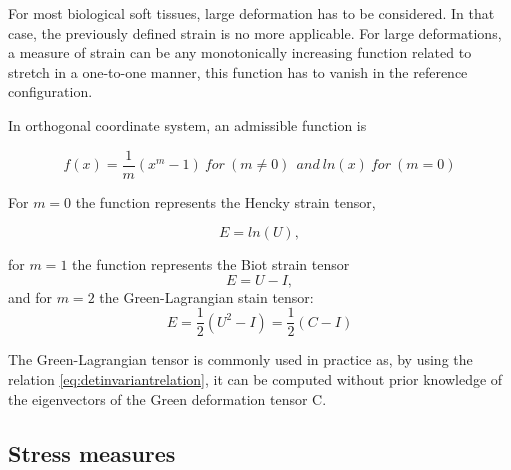 For most biological soft tissues, large deformation has to be considered. In that case, the previously defined strain is no more applicable. For large deformations, a measure of strain can be any monotonically increasing function related to stretch in a one-to-one manner, this function has to vanish in the reference configuration.

In orthogonal coordinate system, an admissible function is 

\begin{equation}
f(x) = \frac{1}{m}(x^m-1) \ for \ (m \neq 0)\  \ and \ ln(x) \ for \ (m=0)
\end{equation}


For $m = 0$ the function represents the Hencky strain tensor, 

\begin{equation}
E = ln(U), 
\end{equation}

for $m=1$  the function represents the Biot strain tensor 
\begin{equation}
E = U-I,
\end{equation}
and for $m=2$ the Green-Lagrangian stain tensor:
\begin{equation}
E = \frac{1}{2}(U^2-I) =  \frac{1}{2}(C-I)
\end{equation}

The Green-Lagrangian tensor is commonly used in practice as, by using the relation \ref{eq:detinvariantrelation}, it can be computed without prior knowledge of the eigenvectors of the Green deformation tensor C.
%

\subsection{Stress measures}\label{subsection:stressmeasure}


